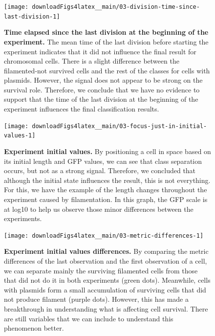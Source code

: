 \documentclass[a4paper, nobind]{templates/ociamthesis}
\begin{document}
\begin{figure}[H]
\texttt{[image: downloadFigs4latex\_\_main/03-division-time-since-last-division-1]} \caption[Time elapsed since the last division at the beginning of the experiment.]{\textbf{Time elapsed since the last division at the beginning of the experiment.} The mean time of the last division before starting the experiment indicates that it did not influence the final result for chromosomal cells. There is a slight difference between the filamented-not survived cells and the rest of the classes for cells with plasmids. However, the signal does not appear to be strong on the survival role. Therefore, we conclude that we have no evidence to support that the time of the last division at the beginning of the experiment influences the final classification results.}\label{fig:03-division-time-since-last-division-1}
\end{figure}





\begin{figure}[H]
\texttt{[image: downloadFigs4latex\_\_main/03-focus-just-in-initial-values-1]} \caption[Experiment initial values.]{\textbf{Experiment initial values.} By positioning a cell in space based on its initial length and GFP values, we can see that class separation occurs, but not as a strong signal. Therefore, we concluded that although the initial state influences the result, this is not everything. For this, we have the example of the length changes throughout the experiment caused by filamentation. In this graph, the GFP scale is at log10 to help us observe those minor differences between the experiments.}\label{fig:03-focus-just-in-initial-values-1}
\end{figure}





\begin{figure}[H]
\texttt{[image: downloadFigs4latex\_\_main/03-metric-differences-1]} \caption[Experiment initial values differences.]{\textbf{Experiment initial values differences.} By comparing the metric differences of the last observation and the first observation of a cell, we can separate mainly the surviving filamented cells from those that did not do it in both experiments (green dots). Meanwhile, cells with plasmids form a small accumulation of surviving cells that did not produce filament (purple dots). However, this has made a breakthrough in understanding what is affecting cell survival. There are still variables that we can include to understand this phenomenon better.}\label{fig:03-metric-differences-1}
\end{figure}
\end{document}
